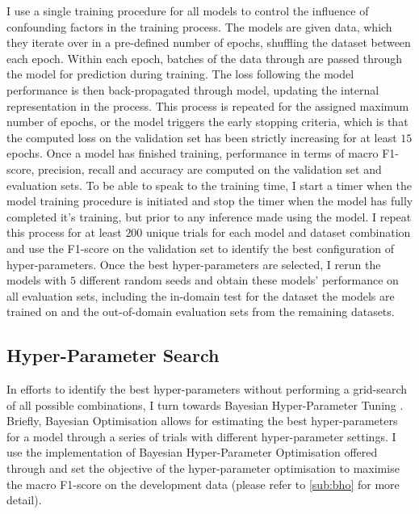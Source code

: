 I use a single training procedure for all models to control the influence of confounding factors in the training process.
The models are given data, which they iterate over in a pre-defined number of epochs, shuffling the dataset between each epoch. Within each epoch, batches of the data through are passed through the model for prediction during training.
The loss following the model performance is then back-propagated through model, updating the internal representation in the process.
This process is repeated for the assigned maximum number of epochs, or the model triggers the early stopping \citep{Early-stopping paper here} criteria, which is that the computed loss on the validation set has been strictly increasing for at least $15$ epochs.
Once a model has finished training, performance in terms of macro F1-score, precision, recall and accuracy are computed on the validation set and evaluation sets. 
To be able to speak to the training time, I start a timer when the model training procedure is initiated and stop the timer when the model has fully completed it's training, but prior to any inference made using the model.
I repeat this process for at least $200$ unique trials for each model and dataset combination and use the F1-score on the validation set to identify the best configuration of hyper-parameters.
Once the best hyper-parameters are selected, I rerun the models with $5$ different random seeds and obtain these models' performance on all evaluation sets, including the in-domain test for the dataset the models are trained on and the out-of-domain evaluation sets from the remaining datasets.

\subsection{Hyper-Parameter Search}\label{sub:liwc_hyperparam}

In efforts to identify the best hyper-parameters without performing a grid-search of all possible combinations, I turn towards Bayesian Hyper-Parameter Tuning \citep{Neal:1996}. Briefly, Bayesian Optimisation allows for estimating the best hyper-parameters for a model through a series of trials with different hyper-parameter settings. I use the implementation of Bayesian Hyper-Parameter Optimisation offered through \citet{Wandb} and set the objective of the hyper-parameter optimisation to maximise the macro F1-score on the development data (please refer to \cref{sub:bho} for more detail).


